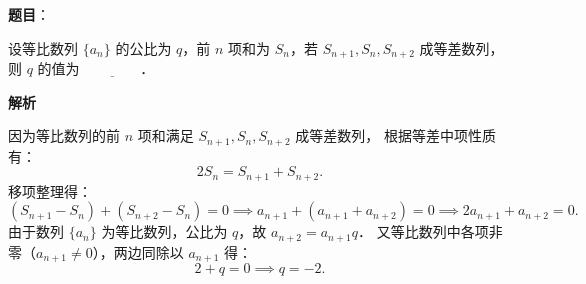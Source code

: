 \begin{answer}

\textbf{题目}：

设等比数列 $\{a_n\}$ 的公比为 $q$，前 $n$ 项和为 $S_n$，若 $S_{n+1}, S_n, S_{n+2}$ 成等差数列，则 $q$ 的值为 $\underline{\qquad\qquad}$．

\textbf{解析}

因为等比数列的前 $n$ 项和满足 $S_{n+1}, S_n, S_{n+2}$ 成等差数列，
根据等差中项性质有：
\nopagebreak[4]
\[
2S_n = S_{n+1} + S_{n+2}.
\]
移项整理得：
\nopagebreak[4]
\[
(S_{n+1} - S_n) + (S_{n+2} - S_n) = 0 \implies a_{n+1} + (a_{n+1} + a_{n+2}) = 0 \implies 2a_{n+1} + a_{n+2} = 0.
\]
由于数列 $\{a_n\}$ 为等比数列，公比为 $q$，故 $a_{n+2} = a_{n+1} q$．
又等比数列中各项非零（$a_{n+1} \neq 0$），两边同除以 $a_{n+1}$ 得：
\nopagebreak[4]
\[
2 + q = 0 \implies q = -2.
\]


\end{answer}
